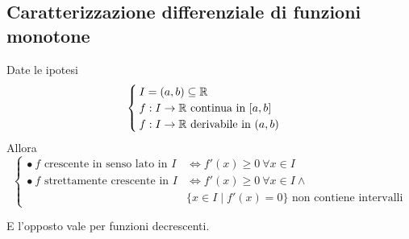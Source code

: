 \subsection[Funzioni monotone]{Caratterizzazione differenziale di funzioni monotone}
\label{der:monotone}
\begin{prop}
	Date le ipotesi
	\[
		\begin{cases}
			I=(a,b)\subseteq\mathbb{R}                   \\
			f:I\to\mathbb{R} \text{ continua in $[a,b]$} \\
			f:I\to\mathbb{R} \text{ derivabile in $(a,b)$}
		\end{cases}
	\]
	Allora
	\[
		\begin{cases}
			\bullet~ f \text{ crescente in senso lato in $I$} & \iff f'(x)\geq0~\forall x\in I                        \\
			\bullet~ f \text{ strettamente crescente in $I$}  & \iff f'(x)\geq0~\forall x\in I\land                   \\
			                                                  & \{x\in I\mid f'(x)=0\}\text{ non contiene intervalli}
		\end{cases}
	\]
\end{prop}
E l'opposto vale per funzioni decrescenti.
